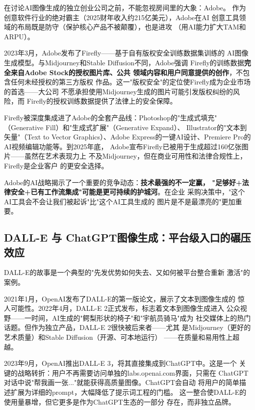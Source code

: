 在讨论AI图像生成的独立创业公司之前，不能忽视房间里的大象：Adobe。
作为创意软件行业的绝对霸主（2025财年收入约215亿美元），Adobe在AI
创意工具领域的布局既是防守（保护核心产品不被颠覆），也是进攻
（用AI能力扩大TAM和ARPU）。

2023年3月，Adobe发布了Firefly——基于自有版权安全训练数据集训练的
AI图像生成模型。与Midjourney和Stable Diffusion不同，Adobe强调
Firefly的训练数据\textbf{完全来自Adobe Stock的授权图片库、公共
领域内容和用户同意提供的创作}，不包含任何未经授权的第三方版权
作品。这一"版权安全"的定位使Firefly成为企业市场的首选——大公司
不愿承担使用Midjourney生成的图片可能引发版权纠纷的风险，而
Firefly的授权训练数据提供了法律上的安全保障。

Firefly被深度集成进了Adobe的全套产品线：Photoshop的"生成式填充"
（Generative Fill）和"生成式扩展"（Generative Expand）、
Illustrator的"文本到矢量"（Text to Vector Graphics）、Adobe
Express的一键AI设计、Premiere Pro的AI视频编辑功能等。到2025年底，
Adobe宣布Firefly已被用于生成超过160亿张图片——虽然在艺术表现力上
不及Midjourney，但在商业可用性和法律合规性上，Firefly是企业客户
的更安全选择。

Adobe的AI战略揭示了一个重要的竞争动态：\textbf{技术最强的不一定赢，
"足够好+法律安全+已有工作流集成"可能是更可持续的护城河}。在企业
采购决策中，"这个AI工具会不会让我们被起诉"比"这个AI工具生成的
图片是不是最漂亮的"更加重要。

\subsection{DALL-E 与 ChatGPT图像生成：平台级入口的碾压效应}
\label{subsec:dalle}

DALL-E的故事是一个典型的"先发优势如何失去、又如何被平台整合重新
激活"的案例。

2021年1月，OpenAI发布了DALL-E的第一版论文，展示了文本到图像生成的
惊人可能性。2022年4月，DALL-E 2正式发布，标志着文本到图像生成进入
公众视野——一时间，AI生成的"鳄梨形状的椅子"和"宇航员骑马"成为
社交媒体上的热门话题。但作为独立产品，DALL-E 2很快被后来者——尤其
是Midjourney（更好的艺术质量）和Stable Diffusion（开源、可本地运行）
——在质量和易用性上超越。

2023年9月，OpenAI推出DALL-E 3，将其直接集成到ChatGPT中。这是一个
关键的战略转折：用户不再需要访问单独的labs.openai.com界面，只需在
ChatGPT对话中说"帮我画一张..."就能获得高质量图像。ChatGPT会自动
将用户的简单描述扩展为详细的prompt，大幅降低了提示词工程的门槛。
这一整合使DALL-E的使用量暴增，但它更多是作为ChatGPT生态的一部分
存在，而非独立品牌。

